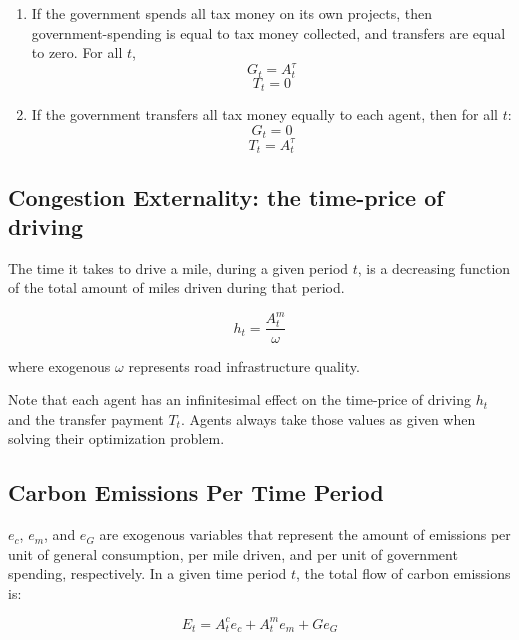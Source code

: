 \documentclass[letter, 12pt, epsf,leqno]{article}
\begin{document}
\begin{enumerate}
\item If the government spends all tax money on its own projects, then government-spending is equal to tax money collected, and transfers are equal to zero.  For all $t$,
\begin{equation}G_t=A^\tau_t\end{equation}
\begin{equation}T_t=0\end{equation}
\item  If the government transfers all tax money equally to each agent, then for all $t$:
\begin{equation}G_t=0\end{equation}
\begin{equation}
T_t=A^\tau_t\label{eq:Tt}%
\end{equation}
\end{enumerate}

\subsection{Congestion Externality: the time-price of driving}
The time it takes to drive a mile, during a given period $t$, is a decreasing function of the total amount of miles driven during that period.

\begin{equation}
h_t = \frac{A^m_t}{\omega}\label{eq:hd}
\end{equation}

where exogenous $\omega$ represents road infrastructure quality.

Note that each agent has an infinitesimal effect on the time-price of driving $h_t$ and the transfer payment $T_t$.  Agents always take those values as given when solving their optimization problem.

\subsection{Carbon Emissions Per Time Period}

$e_c$, $e_m$, and $e_G$ are exogenous variables that represent the amount of emissions per unit of general consumption, per mile driven, and per unit of government spending, respectively.  In a given time period $t$, the total flow of carbon emissions is:

\begin{equation}E_t = A^c_t e_c + A^m_t e_m + G e_G\end{equation}
\end{document}

